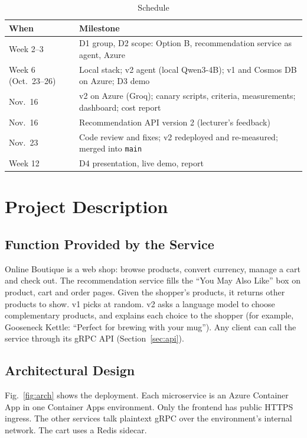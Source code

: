 \documentclass[conference]{IEEEtran}
\begin{document}
\begin{table}[t]
\caption{Schedule}
\label{tab:schedule}
\centering\small
\begin{tabularx}{\columnwidth}{@{}lY@{}}
\toprule
When & Milestone \\
\midrule
Week 2--3 & D1 group, D2 scope: Option B, recommendation service as agent, Azure \\
Week 6 (Oct.\ 23--26) & Local stack; v2 agent (local Qwen3-4B); v1 and Cosmos DB on Azure; D3 demo \\
Nov.\ 16 & v2 on Azure (Groq); canary scripts, criteria, measurements; dashboard; cost report \\
Nov.\ 16 & Recommendation API version 2 (lecturer's feedback) \\
Nov.\ 23 & Code review and fixes; v2 redeployed and re-measured; merged into \texttt{main} \\
Week 12 & D4 presentation, live demo, report \\
\bottomrule
\end{tabularx}
\end{table}

\section{Project Description}

\subsection{Function Provided by the Service}
Online Boutique is a web shop: browse products, convert currency, manage a
cart and check out. The recommendation service fills the ``You May Also
Like'' box on product, cart and order pages. Given the shopper's products,
it returns other products to show. v1 picks at random. v2 asks a language
model to choose complementary products, and explains each choice to the
shopper (for example, Gooseneck Kettle: ``Perfect for brewing with your
mug''). Any client can call the service through its gRPC API (Section~\ref{sec:api}).

\subsection{Architectural Design}
Fig.~\ref{fig:arch} shows the deployment. Each microservice is an Azure
Container App in one Container Apps environment. Only the frontend has
public HTTPS ingress. The other services talk plaintext gRPC over the
environment's internal network. The cart uses a Redis sidecar.
\end{document}
